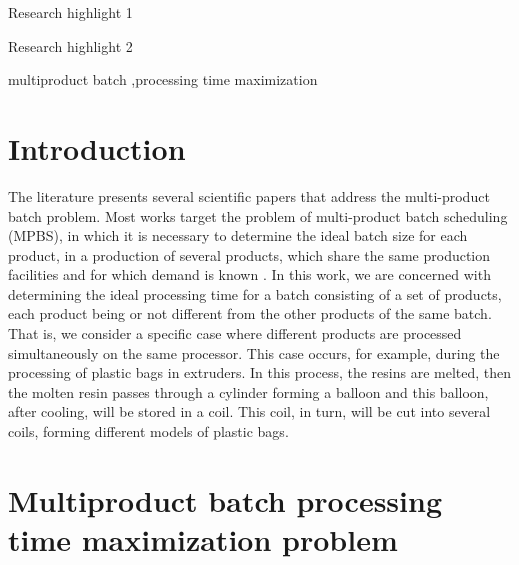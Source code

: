 \documentclass[preprint,12pt,authoryear]{elsarticle}
\begin{document}
\begin{frontmatter}
\begin{highlights}
\item Research highlight 1
\item Research highlight 2
\end{highlights}

\begin{keyword}
multiproduct batch \sep processing time maximization



\end{keyword}

\end{frontmatter}


\section{Introduction}
\label{sec:intro}

The literature presents several scientific papers that address the multi-product batch problem. Most works target the problem of multi-product batch scheduling (MPBS), in which it is necessary to determine the ideal batch size for each product, in a production of several products, which share the same production facilities and for which demand is known \citep{Eilon1985}. In this work, we are concerned with determining the ideal processing time for a batch consisting of a set of products, each product being or not different from the other products of the same batch. That is, we consider a specific case where different products are processed simultaneously on the same processor. This case occurs, for example, during the processing of plastic bags in extruders. In this process, the resins are melted, then the molten resin passes through a cylinder forming a balloon and this balloon, after cooling, will be stored in a coil. This coil, in turn, will be cut into several coils, forming different models of plastic bags.

\section{Multiproduct batch processing time maximization problem}
\label{sec:MBPTMP}
\end{document}
